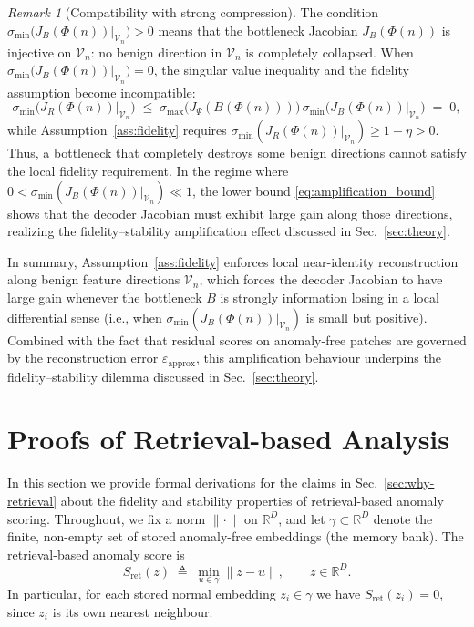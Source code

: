 \documentclass{article}
\theoremstyle{plain}
\theoremstyle{definition}
\theoremstyle{remark}
\newtheorem{remark}[theorem]{Remark}
\begin{document}
\begin{remark}[Compatibility with strong compression]
The condition
$\sigma_{\min}\big(J_B(\Phi(n))\big|_{\mathcal{V}_n}\big)>0$ means that
the bottleneck Jacobian $J_B(\Phi(n))$ is injective on $\mathcal{V}_n$:
no benign direction in $\mathcal{V}_n$ is completely collapsed. When
$\sigma_{\min}\big(J_B(\Phi(n))\big|_{\mathcal{V}_n}\big)=0$, the
singular value inequality and the fidelity assumption become
incompatible:
\begin{equation}
    \sigma_{\min}\big(J_R(\Phi(n))\big|_{\mathcal{V}_n}\big)
    \;\le\;
    \sigma_{\max}\big(J_\Psi(B(\Phi(n)))\big)\,
    \sigma_{\min}\big(J_B(\Phi(n))\big|_{\mathcal{V}_n}\big)
    \;=\; 0,
\end{equation}
while Assumption~\ref{ass:fidelity} requires
$\sigma_{\min}(J_R(\Phi(n))|_{\mathcal{V}_n})\ge 1-\eta>0$. Thus, a
bottleneck that completely destroys some benign directions cannot
satisfy the local fidelity requirement. In the regime where
$0<\sigma_{\min}(J_B(\Phi(n))|_{\mathcal{V}_n})\ll 1$, the lower bound
\eqref{eq:amplification_bound} shows that the decoder Jacobian must
exhibit large gain along those directions, realizing the
fidelity--stability amplification effect discussed in
Sec.~\ref{sec:theory}.
\end{remark}

\medskip

In summary, Assumption~\ref{ass:fidelity} enforces local near-identity
reconstruction along benign feature directions $\mathcal{V}_n$, which
forces the decoder Jacobian to have large gain whenever the bottleneck
$B$ is strongly information losing in a local differential sense (i.e.,
when $\sigma_{\min}(J_B(\Phi(n))|_{\mathcal{V}_n})$ is small but
positive). Combined with the fact that residual scores on anomaly-free
patches are governed by the reconstruction error
$\varepsilon_{\mathrm{approx}}$, this amplification behaviour underpins the
fidelity--stability dilemma discussed in Sec.~\ref{sec:theory}.



\section{Proofs of Retrieval-based Analysis}
\label{sec:proof-retrieval}

In this section we provide formal derivations for the claims in
Sec.~\ref{sec:why-retrieval} about the fidelity and stability properties
of retrieval-based anomaly scoring. Throughout, we fix a norm
$\|\cdot\|$ on $\mathbb{R}^D$, and let
$\gamma\subset \mathbb{R}^D$ denote the finite, non-empty set of stored
anomaly-free embeddings (the memory bank). The retrieval-based anomaly
score is
\begin{equation}
    S_{\mathrm{ret}}(z)
    \;\triangleq\;
    \min_{u\in\gamma} \|z-u\|,
    \qquad z\in\mathbb{R}^D.
\end{equation}
In particular, for each stored normal embedding $z_i\in\gamma$ we
have $S_{\mathrm{ret}}(z_i) = 0$, since $z_i$ is its own nearest
neighbour.
\end{document}
